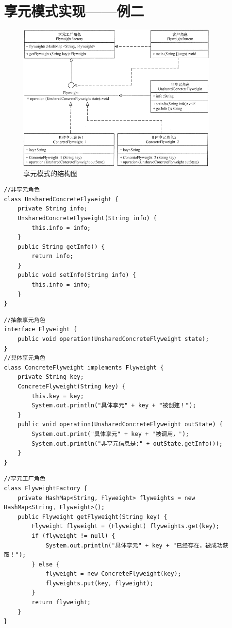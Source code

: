 \section{享元模式实现——例二}
\begin{figure}[!h]
	\centering
	\includegraphics[width=0.9\textwidth]{image/20-2}
	\caption{享元模式的结构图}
\end{figure}
\begin{lstlisting}
//非享元角色
class UnsharedConcreteFlyweight {
	private String info;
	UnsharedConcreteFlyweight(String info) {
		this.info = info;
	}
	public String getInfo() {
		return info;
	}
	public void setInfo(String info) {
		this.info = info;
	}
}
\end{lstlisting}
\begin{lstlisting}
//抽象享元角色
interface Flyweight {
	public void operation(UnsharedConcreteFlyweight state);
}
//具体享元角色
class ConcreteFlyweight implements Flyweight {
	private String key;
	ConcreteFlyweight(String key) {
		this.key = key;
		System.out.println("具体享元" + key + "被创建！");
	}
	public void operation(UnsharedConcreteFlyweight outState) {
		System.out.print("具体享元" + key + "被调用，");
		System.out.println("非享元信息是:" + outState.getInfo());
	}
}
\end{lstlisting}
\begin{lstlisting}
//享元工厂角色
class FlyweightFactory {
	private HashMap<String, Flyweight> flyweights = new HashMap<String, Flyweight>();
	public Flyweight getFlyweight(String key) {
		Flyweight flyweight = (Flyweight) flyweights.get(key);
		if (flyweight != null) {
			System.out.println("具体享元" + key + "已经存在，被成功获取！");
		} else {
			flyweight = new ConcreteFlyweight(key);
			flyweights.put(key, flyweight);
		}
		return flyweight;
	}
}
\end{lstlisting}

